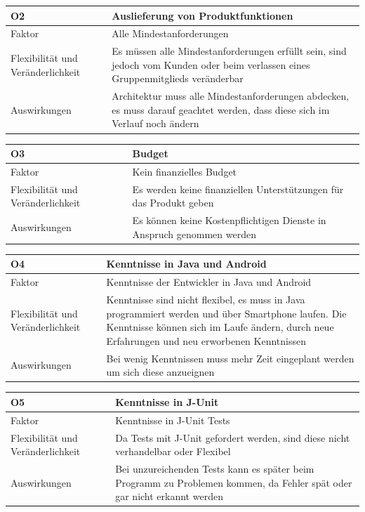 \documentclass[fontsize=12pt,paper=a4,twoside]{scrartcl}
\begin{document}
\begin{table}[H]
\begin{tabular}{|p{3cm}|p{12cm}|}\hline
O2 & Auslieferung von Produktfunktionen\\ \hline
Faktor & Alle Mindestanforderungen\\ \hline
Flexibilität und Veränderlichkeit & Es müssen alle Mindestanforderungen erfüllt sein, sind jedoch vom Kunden oder beim verlassen eines Gruppenmitglieds veränderbar\\ \hline
Auswirkungen & Architektur muss alle Mindestanforderungen abdecken, es muss darauf geachtet werden, dass diese sich im Verlauf noch ändern\\ \hline
\end{tabular}
\end{table}

\begin{table}[H]
\begin{tabular}{|p{3cm}|p{12cm}|}\hline
O3 & Budget \\ \hline
Faktor & Kein finanzielles Budget\\ \hline
Flexibilität und Veränderlichkeit & Es werden keine finanziellen Unterstützungen für das Produkt geben \\ \hline
Auswirkungen & Es können keine Kostenpflichtigen Dienste in Anspruch genommen werden\\ \hline
\end{tabular}
\end{table}

\begin{table}[H]
\begin{tabular}{|p{3cm}|p{12cm}|}\hline
O4 & Kenntnisse in Java und Android \\ \hline
Faktor & Kenntnisse der Entwickler in Java und Android\\ \hline
Flexibilität und Veränderlichkeit & Kenntnisse sind nicht flexibel, es muss in Java programmiert werden und über Smartphone laufen. Die Kenntnisse können sich im Laufe ändern, durch neue Erfahrungen und neu erworbenen Kenntnissen\\ \hline
Auswirkungen & Bei wenig Kenntnissen muss mehr Zeit eingeplant werden um sich diese anzueignen\\ \hline
\end{tabular}
\end{table}

\begin{table}[H]
\begin{tabular}{|p{3cm}|p{12cm}|}\hline
O5 & Kenntnisse in J-Unit \\ \hline
Faktor & Kenntnisse in J-Unit Tests\\ \hline
Flexibilität und Veränderlichkeit & Da Tests mit J-Unit gefordert werden, sind diese nicht verhandelbar oder Flexibel\\ \hline
Auswirkungen & Bei unzureichenden Tests kann es später beim Programm zu Problemen kommen, da Fehler spät oder gar nicht erkannt werden\\ \hline
\end{tabular}
\end{table}
\end{document}
